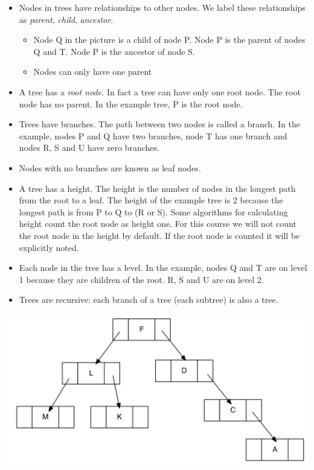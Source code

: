 \begin{itemize}
\item
  Nodes in trees have relationships to other nodes. We label these
  relationships as \emph{parent}, \emph{child}, \emph{ancestor}.

  \begin{itemize}
  \item
    Node Q in the picture is a child of node P. Node P is the parent of
    nodes Q and T. Node P is the ancestor of node S.
  \item
    Nodes can only have one parent
\end{itemize}
\item
  A tree has a \emph{root node.} In fact a tree can have only one root
  node. The root node has no parent. In the example tree, P is the root
  node.
\item
  Trees have branches. The path between two nodes is called a branch. In
  the example, nodes P and Q have two branches, node T has one branch
  and nodes R, S and U have zero branches.
\item
  Nodes with no branches are known as leaf nodes.
\item
  A tree has a height. The height is the number of nodes in the longest
  path from the root to a leaf. The height of the example tree is 2
  because the longest path is from P to Q to (R or S).  Some algorithms for calculating height count the root node as height one.  For this course we will not count the root node in the height by default.  If the root node is counted it will be explicitly noted.
\item
  Each node in the tree has a level. In the example, nodes Q and T are
  on level 1 because they are children of the root. R, S and U are on
  level 2.
\item
  Trees are recursive: each branch of a tree (each subtree) is also a
  tree.
\end{itemize}
  
  \includegraphics[width=6.00000in]{pictures/image2.png}

